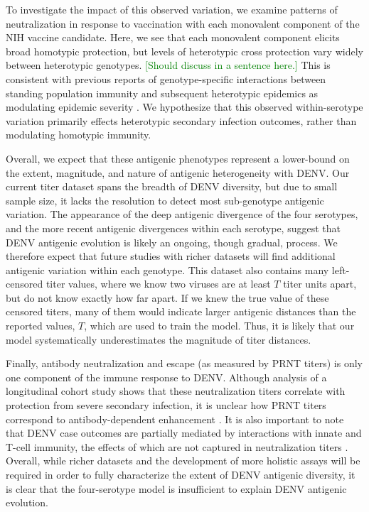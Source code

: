 \documentclass[11pt,oneside,letterpaper]{article}
\def\tbc#1{\textcolor{green}{[#1]}}
\begin{document}
To investigate the impact of this observed variation, we examine patterns of neutralization in response to vaccination with each monovalent component of the NIH vaccine candidate.
Here, we see that each monovalent component elicits broad homotypic protection, but levels of heterotypic cross protection vary widely between heterotypic genotypes.
\tbc{Should discuss \citet{juraska2018viral} in a sentence here.}
This is consistent with previous reports of genotype-specific interactions between standing population immunity and subsequent heterotypic epidemics as modulating epidemic severity \citep{ohainle2011dynamics, kochel2002effect}.
We hypothesize that this observed within-serotype variation primarily effects heterotypic secondary infection outcomes, rather than modulating homotypic immunity.

Overall, we expect that these antigenic phenotypes represent a lower-bound on the extent, magnitude, and nature of antigenic heterogeneity with DENV.
Our current titer dataset spans the breadth of DENV diversity, but due to small sample size, it lacks the resolution to detect most sub-genotype antigenic variation.
The appearance of the deep antigenic divergence of the four serotypes, and the more recent antigenic divergences within each serotype, suggest that DENV antigenic evolution is likely an ongoing, though gradual, process.
We therefore expect that future studies with richer datasets will find additional antigenic variation within each genotype.
This dataset also contains many left-censored titer values, where we know two viruses are at least $T$ titer units apart, but do not know exactly how far apart.
If we knew the true value of these censored titers, many of them would indicate larger antigenic distances than the reported values, $T$, which are used to train the model.
Thus, it is likely that our model systematically underestimates the magnitude of titer distances.

Finally, antibody neutralization and escape (as measured by PRNT titers) is only one component of the immune response to DENV.
Although analysis of a longitudinal cohort study shows that these neutralization titers correlate with protection from severe secondary infection, it is unclear how PRNT titers correspond to antibody-dependent enhancement \citep{katzelnick2016neutralizing}.
It is also important to note that DENV case outcomes are partially mediated by interactions with innate and T-cell immunity, the effects of which are not captured in neutralization titers \citep{green2014innate}.
Overall, while richer datasets and the development of more holistic assays will be required in order to fully characterize the extent of DENV antigenic diversity, it is clear that the four-serotype model is insufficient to explain DENV antigenic evolution.
\end{document}
